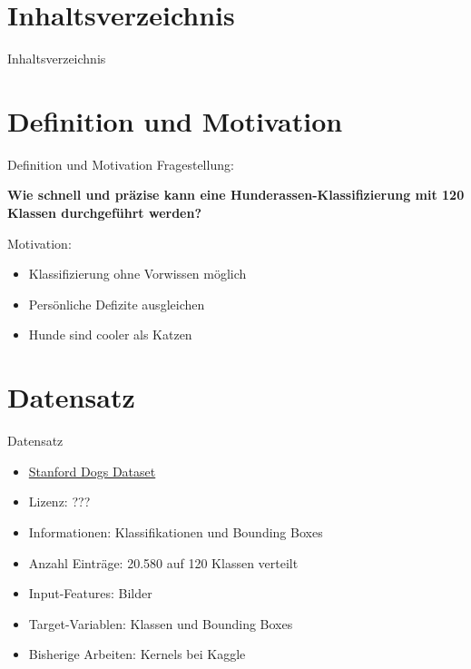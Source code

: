 


\maketitle
  \section*{Inhaltsverzeichnis}
  \begin{frame}{Inhaltsverzeichnis}
    \tableofcontents
  \end{frame}

  \section{Definition und Motivation}
  \begin{frame}{Definition und Motivation}
    Fragestellung:
    \begin{center}
      \textbf{Wie schnell und präzise kann eine Hunderassen-Klassifizierung mit 120 Klassen
      durchgeführt werden?}
    \end{center}
    Motivation:
    \begin{itemize}
      \item Klassifizierung ohne Vorwissen möglich
      \item Persönliche Defizite ausgleichen
      \item Hunde sind cooler als Katzen
    \end{itemize}
  \end{frame}
  \section{Datensatz}
  \begin{frame}{Datensatz}
    \begin{itemize}
      \item \href{https://www.kaggle.com/jessicali9530/stanford-dogs-dataset}{Stanford Dogs Dataset}
      \item Lizenz: ???
      \item Informationen: Klassifikationen und Bounding Boxes
      \item Anzahl Einträge: 20.580 auf 120 Klassen verteilt
      \item Input-Features: Bilder
      \item Target-Variablen: Klassen und Bounding Boxes
      \item Bisherige Arbeiten: Kernels bei Kaggle
    \end{itemize}
  \end{frame}

